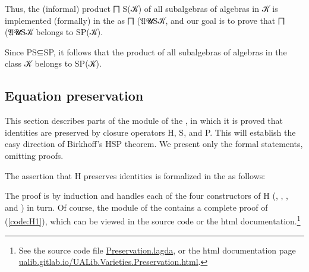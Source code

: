 \documentclass[a4paper,UKenglish,cleveref,autoref,thm-restate]{lipics-v2021}
\begin{document}
Thus, the (informal) product \af ⨅ \ad S(\ab 𝒦) of all subalgebras of algebras in \ab 𝒦 is implemented (formally) in the \ualib as \af ⨅ \as (\af 𝔄\as{\{}\ab 𝓤\as{\}\{}\ad S\as{(}\ab 𝒦\as{)\})}, and our goal is to prove that \af ⨅ \as (\af 𝔄\as{\{}\ab 𝓤\as{\}\{}\ad S\as{(}\ab 𝒦\as{)\})} belongs to \ad S\ad P(\ab 𝒦).
\ccpad
\begin{code}%
  
\end{code}
\ccpad
Since PS⊆SP, it follows that the product of all subalgebras of algebras in the class \ab 𝒦 belongs to \ad S\ad P(\ab 𝒦).
\ccpad
\begin{code}
  
\end{code}





\subsection{Equation preservation}\label{equation-preservation}
This section describes parts of the \ualibPreservation module of the \agdaualib, in which it is proved that identities are preserved by closure operators \ad H, \ad S, and \ad P. This will establish the easy direction of Birkhoff's HSP theorem.  We present only the formal statements, omitting proofs. \seedocfordetails

The assertion that \ad H preserves identities is formalized in the \ualib as follows:
\ccpad
\begin{code}[number=code:H1]%
  
\end{code}
\ccpad
The proof is by induction and handles each of the four constructors of \ad H (,
, , and ) in turn. Of course, the \ualibPreservation module of the \ualib contains a complete proof of (\ref{code:H1}), which can be viewed in the source code or the html documentation.\footnote{\label{note1}See the source code file \href{https://gitlab.com/ualib/ualib.gitlab.io/-/blob/master/UALib/Varieties/Preservation.lagda}{Preservation.lagda}, or the html documentation page\\ \href{https://ualib.gitlab.io/UALib.Varieties.Preservation.html}{ualib.gitlab.io/UALib.Varieties.Preservation.html}.}
\end{document}
